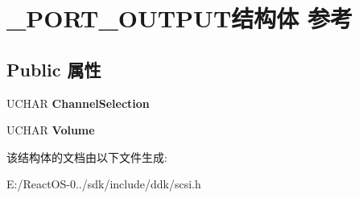 \hypertarget{struct___p_o_r_t___o_u_t_p_u_t}{}\section{\+\_\+\+P\+O\+R\+T\+\_\+\+O\+U\+T\+P\+U\+T结构体 参考}
\label{struct___p_o_r_t___o_u_t_p_u_t}
\subsection*{Public 属性}
\begin{DoxyCompactItemize}
\item 
\mbox{\label{struct___p_o_r_t___o_u_t_p_u_t_a0b27fa4609fb81c2ae1f72d5765d3e52}} 
U\+C\+H\+AR {\bfseries Channel\+Selection}
\item 
\mbox{\label{struct___p_o_r_t___o_u_t_p_u_t_a6fbd8b7132a6edd6addd2fc73bc5ac1e}} 
U\+C\+H\+AR {\bfseries Volume}
\end{DoxyCompactItemize}


该结构体的文档由以下文件生成\+:\begin{DoxyCompactItemize}
\item 
E\+:/\+React\+O\+S-\/0../sdk/include/ddk/scsi.\+h\end{DoxyCompactItemize}

